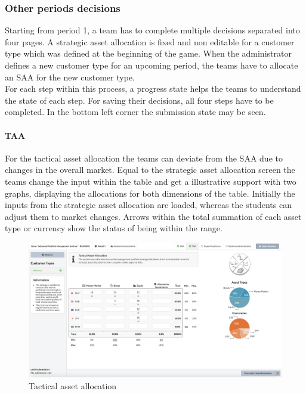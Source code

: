 \subsubsection{Other periods decisions}
Starting from period 1, a team has to complete multiple decisions separated into four pages. A strategic asset allocation is fixed and non editable for a customer type which was defined at the beginning of the game. When the administrator defines a new customer type for an upcoming period, the teams have to allocate an SAA for the new customer type.\\

For each step within this process, a progress state helps the teams to understand the state of each step. For saving their decisions, all four steps have to be completed. In the bottom left corner the submission state may be seen.

\paragraph{TAA}
For the tactical asset allocation the teams can deviate from the SAA due to changes in the overall market. Equal to the strategic asset allocation screen the teams change the input within the table and get a illustrative support with two graphs, displaying the allocations for both dimensions of the table. Initially the inputs from the strategic asset allocation are loaded, whereas the students can adjust them to market changes. Arrows within the total summation of each asset type or currency show the status of being within the range.
\begin{figure}[h!]
  \centering
  \includegraphics[scale=0.2]{img/application-overview/teams/04_taa.png}
  \caption{Tactical asset allocation}
\end{figure}

